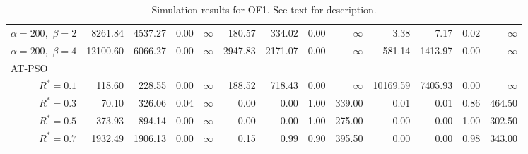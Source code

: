 \documentclass[12pt]{article}
\begin{document}
\begin{table}[ht]
{\begin{tabular}{r|rrrr|rrrr|rrrr}
  $\alpha = 200,$ $\beta =2$ & 8261.84 & 4537.27 & 0.00 & $\infty$ & 180.57 & 334.02 & 0.00 & $\infty$ & 3.38 & 7.17 & 0.02 & $\infty$ \\ 
  $\alpha = 200,$ $\beta =4$ & 12100.60 & 6066.27 & 0.00 & $\infty$ & 2947.83 & 2171.07 & 0.00 & $\infty$ & 581.14 & 1413.97 & 0.00 & $\infty$ \\ 
\hline
\multicolumn{1}{l|}{AT-PSO} &&&&&&&&&&&&\\
  $R^* = 0.1$ & 118.60 & 228.55 & 0.00 & $\infty$ & 188.52 & 718.43 & 0.00 & $\infty$ & 10169.59 & 7405.93 & 0.00 & $\infty$ \\ 
  $R^* = 0.3$ & 70.10 & 326.06 & 0.04 & $\infty$ & 0.00 & 0.00 & 1.00 & 339.00 & 0.01 & 0.01 & 0.86 & 464.50 \\ 
  $R^* = 0.5$ & 373.93 & 894.14 & 0.00 & $\infty$ & 0.00 & 0.00 & 1.00 & 275.00 & 0.00 & 0.00 & 1.00 & 302.50 \\ 
  $R^* = 0.7$ & 1932.49 & 1906.13 & 0.00 & $\infty$ & 0.15 & 0.99 & 0.90 & 395.50 & 0.00 & 0.00 & 0.98 & 343.00 \\ 
   \hline
\end{tabular}
}
\caption{Simulation results for OF1. See text for description.}
\label{tab:psosim1}
\end{table}
\end{document}
